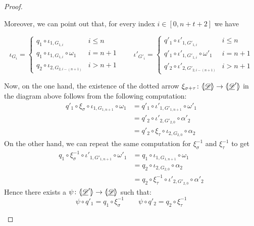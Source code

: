 \begin{proof}
\begin{itemize}
Moreover, we can point out that, for every index $i\in [0,n+t+2]$ we have

\[\iota_{G_i}=\begin{cases}q_1\circ \iota_{1, G_{1,i}} & i \leq n\\
	q_1\circ \iota_{1, G_{1, i}}\circ \omega_1& i=n+1\\
	q_2\circ \iota_{2, G_{2,i-(n+1)}} & i > n+1 
\end{cases} \qquad \iota'_{G'_i}=\begin{cases}q'_1\circ \iota'_{1, G'_{1,i}} & i \leq n\\
	q'_1\circ \iota'_{1, G'_{1, i}}\circ \omega'_1& i=n+1\\
	q'_2\circ \iota'_{2, G'_{2,i-(n+1)}} & i > n+1 
\end{cases}\]

Now, on the one hand, the existence of the dotted arrow $\xi_{\sigma+\tau}\colon \langle \hspace{-1.85pt}[ \underline{\mathscr{D}}]\hspace{-1.85pt}\rangle\to \langle \hspace{-1.85pt}[ \underline{\mathscr{D}}']\hspace{-1.85pt}\rangle$ in the diagram above follows from the following computation:
\begin{align*}
	q'_1\circ \xi_\sigma \circ \iota_{1, G_{1,n+1}} \circ \omega_1&=q'_1\circ \iota'_{1,G'_{1, n+1}} \circ \omega'_1\\&= q'_2 \circ \iota'_{2, G'_{2,0}} \circ \alpha'_2\\&=q'_2\circ \xi_\tau \circ \iota_{2, G_{2,0}} \circ \alpha_2
\end{align*} 
On the other hand, we can repeat the same computation for $\xi^{-1}_\sigma$ and $\xi^{-1}_\tau$ to get
\begin{align*}
	q_1\circ \xi^{-1}_\sigma \circ \iota'_{1, G'_{1,n+1}} \circ \omega'_1&=q_1\circ \iota_{1,G_{1, n+1}} \circ \omega_1\\&= q_2 \circ \iota_{2, G_{2,0}} \circ \alpha_2\\&=q_2\circ \xi^{-1}_\tau \circ \iota'_{2, G'_{2,0}} \circ \alpha'_2
\end{align*} 
Hence there exists a $\psi\colon \langle \hspace{-1.85pt}[ \underline{\mathscr{D}}']\hspace{-1.85pt}\rangle \to \langle \hspace{-1.85pt}[ \underline{\mathscr{D}}]\hspace{-1.85pt}\rangle$ such that:
\[\psi \circ q'_1=q_1\circ \xi^{-1}_\sigma \qquad \psi \circ q'_2=q_2\circ \xi^{-1}_\tau\]


\end{itemize}
\end{proof}
